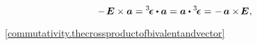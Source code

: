 \nopagebreak\vspace{.6em}
\begin{equation}\label{commutativity.unitdyad-cross-vector}
- \hspace{.25ex} \UnitDyad \times \bm{a}
= \hspace{-0.2em} \tikzmark{HEADPermutationsparityDotVector} \hspace{.2em}
     \permutationsparitytensor \dotp \bm{a}
\hspace{.2em} \tikzmark{PermutationsparityDotVectorTAIL} \hspace{-0.2em}
= \hspace{-0.2em} \tikzmark{HEADVectorDotPermutationsparity} \hspace{.2em}
     \bm{a} \dotp \permutationsparitytensor
\hspace{.2em} \tikzmark{VectorDotPermutationsparityTAIL} \hspace{-0.2em}
= \hspace{.1ex} - \hspace{.3ex} \bm{a} \times \hspace{-0.25ex} \UnitDyad
\hspace{.1ex} ,
\end{equation}%

\vspace{-1.5em}\noindent
{}
~\eqref{commutativity.thecrossproductofbivalentandvector}

